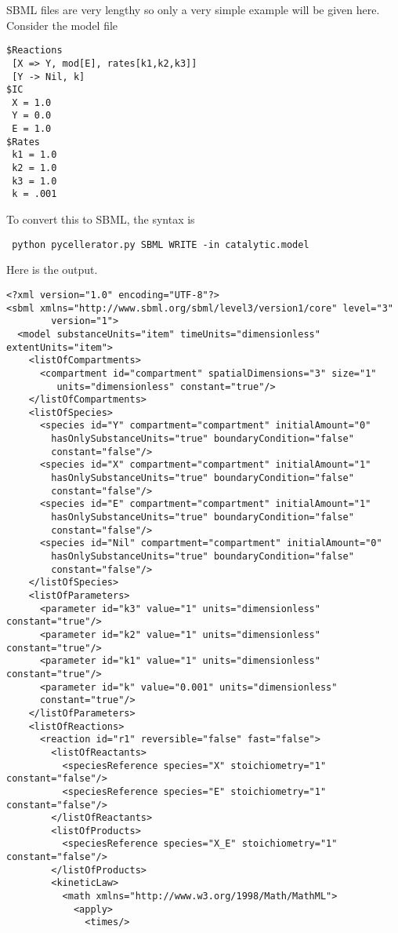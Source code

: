 SBML files are very lengthy so only a very simple example will be given here. Consider the model file 
\begin{lstlisting}
$Reactions
 [X => Y, mod[E], rates[k1,k2,k3]]
 [Y -> Nil, k]
$IC
 X = 1.0
 Y = 0.0
 E = 1.0
$Rates
 k1 = 1.0
 k2 = 1.0
 k3 = 1.0
 k = .001
\end{lstlisting}
To convert this to SBML, the syntax is
\begin{lstlisting}
 python pycellerator.py SBML WRITE -in catalytic.model
\end{lstlisting}
Here is the output.
\begin{lstlisting}[xrightmargin=0in]
<?xml version="1.0" encoding="UTF-8"?>
<sbml xmlns="http://www.sbml.org/sbml/level3/version1/core" level="3" 
		version="1">
  <model substanceUnits="item" timeUnits="dimensionless" extentUnits="item">
    <listOfCompartments>
      <compartment id="compartment" spatialDimensions="3" size="1"
      	 units="dimensionless" constant="true"/>
    </listOfCompartments>
    <listOfSpecies>
      <species id="Y" compartment="compartment" initialAmount="0" 
      	hasOnlySubstanceUnits="true" boundaryCondition="false" 
      	constant="false"/>
      <species id="X" compartment="compartment" initialAmount="1" 
      	hasOnlySubstanceUnits="true" boundaryCondition="false" 
      	constant="false"/>
      <species id="E" compartment="compartment" initialAmount="1" 
      	hasOnlySubstanceUnits="true" boundaryCondition="false" 
      	constant="false"/>
      <species id="Nil" compartment="compartment" initialAmount="0" 
      	hasOnlySubstanceUnits="true" boundaryCondition="false" 
      	constant="false"/>
    </listOfSpecies>
    <listOfParameters>
      <parameter id="k3" value="1" units="dimensionless" constant="true"/>
      <parameter id="k2" value="1" units="dimensionless" constant="true"/>
      <parameter id="k1" value="1" units="dimensionless" constant="true"/>
      <parameter id="k" value="0.001" units="dimensionless" 
      constant="true"/>
    </listOfParameters>
    <listOfReactions>
      <reaction id="r1" reversible="false" fast="false">
        <listOfReactants>
          <speciesReference species="X" stoichiometry="1" constant="false"/>
          <speciesReference species="E" stoichiometry="1" constant="false"/>
        </listOfReactants>
        <listOfProducts>
          <speciesReference species="X_E" stoichiometry="1" constant="false"/>
        </listOfProducts>
        <kineticLaw>
          <math xmlns="http://www.w3.org/1998/Math/MathML">
            <apply>
              <times/>

\end{lstlisting}
